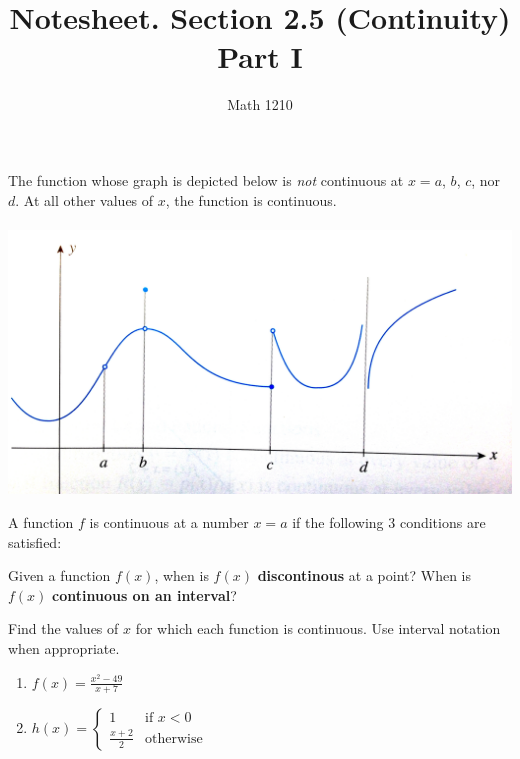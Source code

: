 \documentclass[12pt, a4paper]{article}
\author{Math 1210}
\title{Notesheet. Section 2.5 (Continuity) Part I}
\date{}
\begin{document}
\maketitle
\nameline
\begin{examp}
  The function whose graph is depicted below is \textit{not} continuous at $x = a$, $b$, $c$, nor $d$.  At all other values of $x$, the function is continuous. \\\\

  \includegraphics[scale=0.09]{images/non-continuous-examples-contrast}
\end{examp}
\begin{defi}
  A function $f$ is continuous at a number $x = a$ if the following 3 conditions are satisfied:
\end{defi}
\begin{defi}
  Given a function \(f(x)\), when is \(f(x)\) \textbf{discontinous} at
  a point? When is \(f(x)\) \textbf{continuous on an interval}?
\end{defi}
\begin{ex}
  Find the values of $x$ for which each function is continuous.  Use interval notation when appropriate.
  \begin{enumerate}
    \item $f(x) = \frac{x^2 - 49}{x + 7}$
    \item $h(x) = \begin{cases}
      1 &\text{if $x < 0$} \\
      \frac{x + 2}{2} &\text{otherwise}
    \end{cases}$
  \end{enumerate}
\end{ex}
\end{document}
